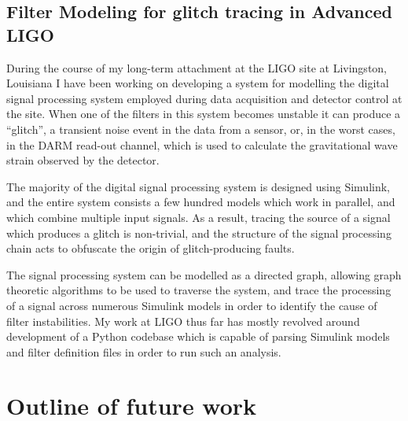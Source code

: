 \documentclass[openleft]{kentigern}
\theoremstyle{definition}
\begin{document}
\section{Filter Modeling for glitch tracing in Advanced LIGO}
\label{sec:glitchtracing}

During the course of my long-term attachment at the LIGO site at
Livingston, Louisiana I have been working on developing a system for
modelling the digital signal processing system employed during data
acquisition and detector control at the site. When one of the filters
in this system becomes unstable it can produce a ``glitch'', a
transient noise event in the data from a sensor, or, in the worst
cases, in the DARM read-out channel, which is used to calculate the
gravitational wave strain observed by the detector.

The majority of the digital signal processing system is designed using
Simulink, and the entire system consists a few hundred models which
work in parallel, and which combine multiple input signals. As a
result, tracing the source of a signal which produces a glitch is
non-trivial, and the structure of the signal processing chain acts to
obfuscate the origin of glitch-producing faults.

The signal processing system can be modelled as a directed graph,
allowing graph theoretic algorithms to be used to traverse the system,
and trace the processing of a signal across numerous Simulink models
in order to identify the cause of filter instabilities. My work at
LIGO thus far has mostly revolved around development of a Python
codebase which is capable of parsing Simulink models and filter
definition files in order to run such an analysis.


\appendices

\chapter{Outline of future work}
\label{part:future}

\backmatter






%

\glsaddall
{}
\printglossaries
\end{document}
